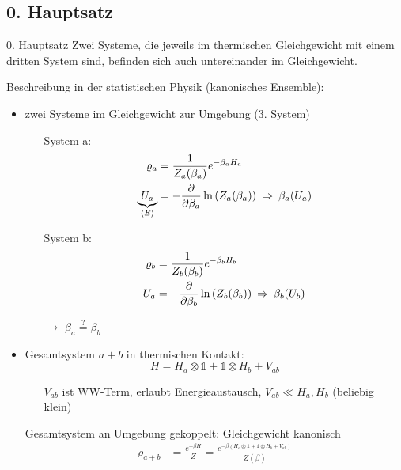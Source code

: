 \subsection{0. Hauptsatz}
\begin{definition}{0. Hauptsatz}
    Zwei Systeme, die jeweils im thermischen Gleichgewicht mit einem dritten System sind, befinden sich auch untereinander im Gleichgewicht.
\end{definition}
Beschreibung in der statistischen Physik (kanonisches Ensemble):
\begin{itemize}
    \item zwei Systeme im Gleichgewicht zur Umgebung (3. System)
    \begin{itemize}
        \item[] System a:
        \begin{align}
            \varrho_a &= \frac{1}{Z_a(\beta_a)} e^{-\beta_a H_a} \\
            \underbrace{U_a}_{\langle E \rangle} &= - \frac{\partial }{\partial \beta_a} \ln\left( Z_a(\beta_a) \right) \: \Rightarrow \: \beta_a(U_a)
        \end{align}
        \item[] System b:
        \begin{align}
            \varrho_b &= \frac{1}{Z_b(\beta_b)} e^{- \beta_b H_b} \\
            U_a &= - \frac{\partial }{\partial \beta_b} \ln\left( Z_b(\beta_b) \right) \: \Rightarrow \: \beta_b(U_b)
        \end{align}
        \item[$\rightarrow$] $\beta_a \stackrel{?}{=} \beta_b$ 
    \end{itemize}
    \item Gesamtsystem $a+b$ in thermischen Kontakt:
    \begin{equation}
        H = H_a \otimes \mathds{1} + \mathds{1} \otimes H_b + V_{ab}
    \end{equation}
    \begin{itemize}
        \item[] $V_{ab}$ ist WW-Term, erlaubt Energieaustausch, $V_{ab} \ll H_a, H_b$ (beliebig klein)
    \end{itemize}
    \item[] Gesamtsystem an Umgebung gekoppelt: Gleichgewicht kanonisch
    \begin{align}
        \varrho_{a+b} &= \frac{e^{-\beta H}}{Z} = \frac{e^{-\beta\left(H_a \otimes \mathds{1} + \mathds{1} \otimes H_b + V_{ab}\right)}}{Z(\beta)} \\

\end{align}
\end{itemize}
